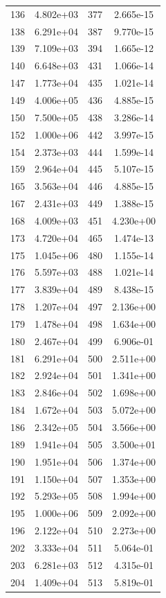 \documentclass[12pt]{article}
\begin{document}
\begin{longtable}{@{}cccc@{}}
136 & 4.802e+03 & 377 & 2.665e-15 \\
138 & 6.291e+04 & 387 & 9.770e-15 \\
139 & 7.109e+03 & 394 & 1.665e-12 \\
140 & 6.648e+03 & 431 & 1.066e-14 \\
147 & 1.773e+04 & 435 & 1.021e-14 \\
149 & 4.006e+05 & 436 & 4.885e-15 \\
150 & 7.500e+05 & 438 & 3.286e-14 \\
152 & 1.000e+06 & 442 & 3.997e-15 \\
154 & 2.373e+03 & 444 & 1.599e-14 \\
159 & 2.964e+04 & 445 & 5.107e-15 \\
165 & 3.563e+04 & 446 & 4.885e-15 \\
167 & 2.431e+03 & 449 & 1.388e-15 \\
168 & 4.009e+03 & 451 & 4.230e+00 \\
173 & 4.720e+04 & 465 & 1.474e-13 \\
175 & 1.045e+06 & 480 & 1.155e-14 \\
176 & 5.597e+03 & 488 & 1.021e-14 \\
177 & 3.839e+04 & 489 & 8.438e-15 \\
178 & 1.207e+04 & 497 & 2.136e+00 \\
179 & 1.478e+04 & 498 & 1.634e+00 \\
180 & 2.467e+04 & 499 & 6.906e-01 \\
181 & 6.291e+04 & 500 & 2.511e+00 \\
182 & 2.924e+04 & 501 & 1.341e+00 \\
183 & 2.846e+04 & 502 & 1.698e+00 \\
184 & 1.672e+04 & 503 & 5.072e+00 \\
186 & 2.342e+05 & 504 & 3.566e+00 \\
189 & 1.941e+04 & 505 & 3.500e+01 \\
190 & 1.951e+04 & 506 & 1.374e+00 \\
191 & 1.150e+04 & 507 & 1.353e+00 \\
192 & 5.293e+05 & 508 & 1.994e+00 \\
195 & 1.000e+06 & 509 & 2.092e+00 \\
196 & 2.122e+04 & 510 & 2.273e+00 \\
202 & 3.333e+04 & 511 & 5.064e-01 \\
203 & 6.281e+03 & 512 & 4.315e-01 \\
204 & 1.409e+04 & 513 & 5.819e-01 \\

\end{longtable}
\end{document}
